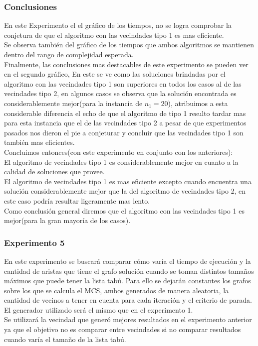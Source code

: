 \subsubsection*{Conclusiones}\;
En este Experimento el el gráfico de los tiempos, no se logra comprobar la conjetura de que el algoritmo con las vecindades tipo 1 es mas eficiente.\\
Se observa también del gráfico de los tiempos que ambos algoritmos se mantienen dentro del rango de complejidad esperada.\\
Finalmente, las conclusiones mas destacables de este experimento se pueden ver en el segundo gráfico, En este se ve como las soluciones brindadas por el algoritmo con las vecindades tipo 1 son superiores en todos los casos al de las vecindades tipo 2, en algunos casos se observa que la solución encontrada es considerablemente mejor(para la instancia de $n_1=20$), atribuimos a esta considerable diferencia el echo de que el algoritmo de tipo 1 resulto tardar mas para esta instancia que el de las vecindades tipo 2 a pesar de que experimentos pasados nos dieron el pie a conjeturar y concluir que las vecindades tipo 1 son también mas eficientes.\\
Concluimos entonces(con este experimento en conjunto con los anteriores):\\
El algoritmo de vecindades tipo 1 es considerablemente mejor en cuanto a la calidad de soluciones que provee.\\
El algoritmo de vecindades tipo 1 es mas eficiente excepto cuando encuentra una solución considerablemente mejor que la del algoritmo de vecindades tipo 2, en este caso podría resultar ligeramente mas lento.\\
Como conclusión general diremos que el algoritmo con las vecindades tipo 1 es mejor(para la gran mayoría de los casos).

\subsubsection*{Experimento 5}\;
\noindent En este experimento se buscará comparar cómo varía el tiempo de ejecución y la cantidad de aristas que tiene el grafo solución cuando se toman distintos tamaños máximos que puede tener la lista tabú. Para ello se dejarán constantes los grafos sobre los que se calcula el MCS, ambos generados de manera aleatoria, la cantidad de vecinos a tener en cuenta para cada iteración y el criterio de parada.\\
El generador utilizado será el mismo que en el experimento 1.\\
Se utilizará la vecindad que generó mejores resultados en el experimento anterior ya que el objetivo no es comparar entre vecindades si no comparar resultados cuando varía el tamaño de la lista tabú.

